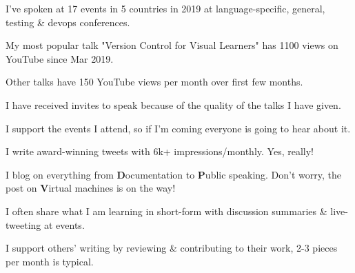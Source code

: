 \documentclass[letterpaper]{deedy-resume} %
\begin{document}
\begin{minipage}[t]{0.66\textwidth}

\vspace{\topsep} %
\begin{tightitemize}
\item I've spoken at 17 events in 5 countries in 2019 at language-specific, general, testing \& devops conferences.
\item My most popular talk "Version Control for Visual Learners" has 1100 views on YouTube since Mar 2019.
\item Other talks have 150 YouTube views per month over first few months.
\item I have received invites to speak because of the quality of the talks I have given.
\end{tightitemize}

\sectionspace %


\begin{tightitemize}
\item I support the events I attend, so if I'm coming everyone is going to hear about it.
\item I write award-winning tweets with 6k+ impressions/monthly. Yes, really!
\end{tightitemize}

\sectionspace %


\begin{tightitemize}
\item I blog on everything from \textbf{D}ocumentation to \textbf{P}ublic speaking. Don't worry, the post on \textbf{V}irtual machines is on the way!
\item I often share what I am learning in short-form with discussion summaries \& live-tweeting at events.
\item I support others' writing by reviewing \& contributing to their work, 2-3 pieces per month is typical.
\end{tightitemize}


\end{minipage}
\end{document}
